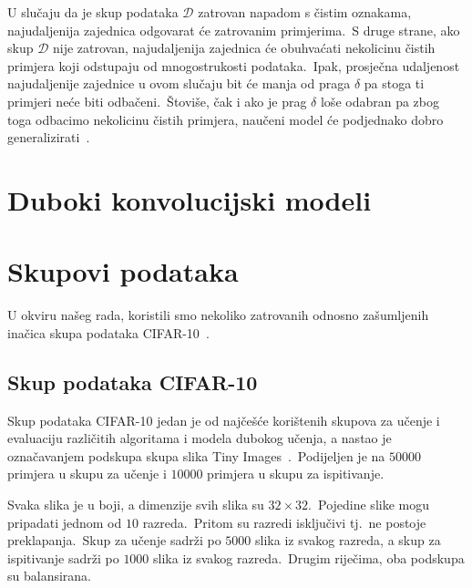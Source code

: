 \documentclass[diplomskirad]{fer}
\begin{document}
\pagebreak

U slučaju da je skup podataka $\mathcal{D}$ zatrovan napadom s čistim oznakama, najudaljenija zajednica odgovarat će zatrovanim primjerima.\ 
S druge strane, ako skup $\mathcal{D}$ nije zatrovan, najudaljenija zajednica će obuhvaćati nekolicinu čistih primjera koji odstupaju od mnogostrukosti podataka.\ 
Ipak, prosječna udaljenost najudaljenije zajednice u ovom slučaju bit će manja od praga $\delta$ pa stoga ti primjeri neće biti odbačeni.\ 
Štoviše, čak i ako je prag $\delta$ loše odabran pa zbog toga odbacimo nekolicinu čistih primjera, naučeni model će podjednako dobro generalizirati~\cite{sabolic2025seal}.\

\chapter{Duboki konvolucijski modeli}
\label{pog:cnn}

\chapter{Skupovi podataka}
\label{pog:skup}

U okviru našeg rada, koristili smo nekoliko zatrovanih odnosno zašumljenih inačica skupa podataka CIFAR-10~\cite{krizhevsky2009learning}.\

\section{Skup podataka CIFAR-10}
\label{sek:cifar10}

Skup podataka CIFAR-10 jedan je od najčešće korištenih skupova za učenje i evaluaciju različitih algoritama i modela dubokog učenja, a nastao je označavanjem podskupa skupa slika Tiny Images~\cite{krizhevsky2009learning}.\
Podijeljen je na $50 000$ primjera u skupu za učenje i $10 000$ primjera u skupu za ispitivanje.\ 
  
Svaka slika je u boji, a dimenzije svih slika su $32 \times 32$.\ Pojedine slike mogu pripadati jednom od $10$ razreda.\ Pritom su razredi isključivi tj.\ ne postoje preklapanja.\ 
Skup za učenje sadrži po $5000$ slika iz svakog razreda, a skup za ispitivanje sadrži po $1000$ slika iz svakog razreda.\ Drugim riječima, oba podskupa su balansirana.\ 
\end{document}
